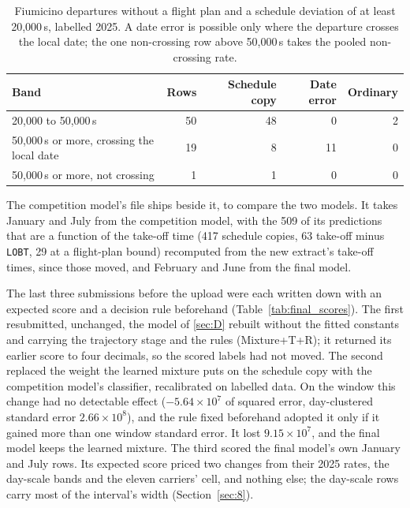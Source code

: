 \documentclass[
  manuscript=article,
  layout=preprint,
  year=2026,
  volume=x,
]{extra/joas}
\begin{document}
\begin{table}[htbp!]
  \centering
  \small
  \caption{Fiumicino departures without a flight plan and a schedule deviation of at least 20,000\,s, labelled 2025. A date error is possible only where the departure crosses the local date; the one non-crossing row above 50,000\,s takes the pooled non-crossing rate.}
  \label{tab:final_bands}
  \begin{tabular*}{\linewidth}{@{\extracolsep{\fill}}lrrrr}
  \toprule
  \textbf{Band} & \textbf{Rows} & \textbf{Schedule copy} & \textbf{Date error} & \textbf{Ordinary} \\
  \midrule
  20,000 to 50,000\,s & 50 & 48 & 0 & 2 \\
  50,000\,s or more, crossing the local date & 19 & 8 & 11 & 0 \\
  50,000\,s or more, not crossing & 1 & 1 & 0 & 0 \\
  \bottomrule
  \end{tabular*}
\end{table}

The competition model's file ships beside it, to compare the two models. It takes January and July from the competition model, with the 509 of its predictions that are a function of the take-off time (417 schedule copies, 63 take-off minus \texttt{LOBT}, 29 at a flight-plan bound) recomputed from the new extract's take-off times, since those moved, and February and June from the final model.

The last three submissions before the upload were each written down with an expected score and a decision rule beforehand (Table~\ref{tab:final_scores}). The first resubmitted, unchanged, the model of \ref{sec:D} rebuilt without the fitted constants and carrying the trajectory stage and the rules (Mixture+T+R); it returned its earlier score to four decimals, so the scored labels had not moved. The second replaced the weight the learned mixture puts on the schedule copy with the competition model's classifier, recalibrated on labelled data. On the window this change had no detectable effect ($-5.64\times10^{7}$ of squared error, day-clustered standard error $2.66\times10^{8}$), and the rule fixed beforehand adopted it only if it gained more than one window standard error. It lost $9.15\times10^{7}$, and the final model keeps the learned mixture. The third scored the final model's own January and July rows. Its expected score priced two changes from their 2025 rates, the day-scale bands and the eleven carriers' cell, and nothing else; the day-scale rows carry most of the interval's width (Section~\ref{sec:8}).
\end{document}
